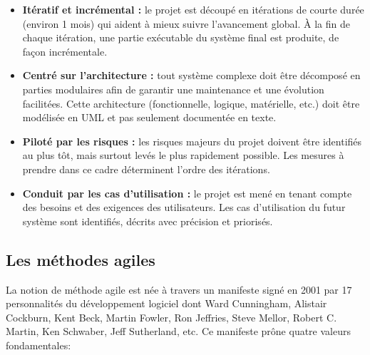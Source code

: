 \begin{itemize}
    \item [\textbullet] \textbf{Itératif et incrémental :} le projet est découpé
        en itérations de courte durée (environ 1 mois) qui aident à mieux suivre
        l’avancement global. À la fin de chaque itération, une partie exécutable
        du système final est produite, de façon incrémentale.
    \item [\textbullet] \textbf{Centré sur l’architecture :} tout système
        complexe doit être décomposé en parties modulaires afin de garantir une
        maintenance et une évolution facilitées. Cette architecture
        (fonctionnelle, logique, matérielle, etc.) doit être modélisée en UML et
        pas seulement documentée en texte.
    \item [\textbullet] \textbf{Piloté par les risques :} les risques majeurs du
        projet doivent être identifiés au plus tôt, mais surtout levés le plus
        rapidement possible. Les mesures à prendre dans ce cadre déterminent
        l’ordre des itérations.
    \item [\textbullet] \textbf{Conduit par les cas d’utilisation :} le projet
        est mené en tenant compte des besoins et des exigences des utilisateurs.
        Les cas d’utilisation du futur système sont identifiés, décrits avec
        précision et priorisés.
        \cite{5}
\end{itemize}
    
\subsection{Les méthodes agiles}
La notion de méthode agile est née à travers un manifeste signé en 2001 par 17
personnalités du développement logiciel dont Ward Cunningham, Alistair
Cockburn, Kent Beck, Martin Fowler, Ron Jeffries, Steve Mellor, Robert C.
Martin, Ken Schwaber, Jeff Sutherland, etc. Ce manifeste prône quatre valeurs
fondamentales: 

